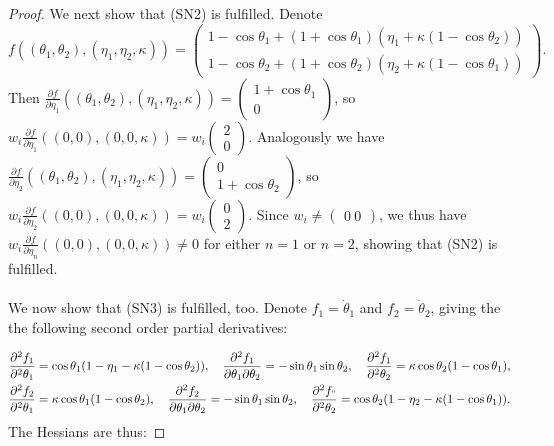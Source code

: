 \documentclass{article}
\theoremstyle{definition}
\begin{document}
\begin{refsection}
\begin{proof}
We next show that (SN2) is fulfilled. Denote $$f((\theta_1,\theta_2),(\eta_1,\eta_2,\kappa)) = \begin{pmatrix}  1 - \cos\theta_1 + \left(1 + \cos\theta_1\right) \left(\eta_1 + \kappa \left(1 - \cos\theta_2\right)\right) \\  1 - \cos\theta_2 + \left(1 + \cos\theta_2\right) \left(\eta_2 + \kappa \left(1 - \cos\theta_1\right)\right)\end{pmatrix}.$$
Then $\frac{\partial f}{\partial \eta_1}((\theta_1,\theta_2),(\eta_1,\eta_2,\kappa)) = \begin{pmatrix}1 + \cos\theta_1 \\ 0\end{pmatrix}$, so $w_i\frac{\partial f}{\partial \eta_1}((0,0),(0,0,\kappa))=w_i\begin{pmatrix}2\\0\end{pmatrix}$. Analogously we have $\frac{\partial f}{\partial \eta_2}((\theta_1,\theta_2),(\eta_1,\eta_2,\kappa)) = \begin{pmatrix}0\\1 + \cos\theta_2\end{pmatrix}$, so $w_i\frac{\partial f}{\partial \eta_2}((0,0),(0,0,\kappa))=w_i\begin{pmatrix}0\\2\end{pmatrix}$. Since $w_i\neq\begin{pmatrix}0 \ 0\end{pmatrix}$, we thus have $w_i\frac{\partial f}{\partial \eta_n}((0,0),(0,0,\kappa))\neq0$ for either $n=1$ or $n=2$, showing that (SN2) is fulfilled.
\\ \\
We now show that (SN3) is fulfilled, too. Denote $f_1=\dot\theta_1$ and $f_2=\dot\theta_2$, giving the the following second order partial derivatives:

\begin{align*}
    \frac{\partial^2 f_1}{\partial^2 \theta_1} &= \cos\theta_1(1-\eta_1-\kappa(1-\cos\theta_2)),\quad
    \frac{\partial^2 f_1}{\partial \theta_1 \partial \theta_2} = -\sin\theta_1\sin\theta_2,\quad
    \frac{\partial^2 f_1}{\partial^2 \theta_2} = \kappa\cos\theta_2(1-\cos\theta_1),\\
    \frac{\partial^2 f_2}{\partial^2 \theta_1} &= \kappa\cos\theta_1(1-\cos\theta_2),\quad
    \frac{\partial^2 f_2}{\partial \theta_1 \partial \theta_2} = -\sin\theta_1\sin\theta_2, \quad
    \frac{\partial^2 f_"}{\partial^2 \theta_2} =  \cos\theta_2(1-\eta_2-\kappa(1-\cos\theta_1)).
\end{align*}
 The Hessians are thus:


\end{proof}
\end{refsection}
\end{document}
